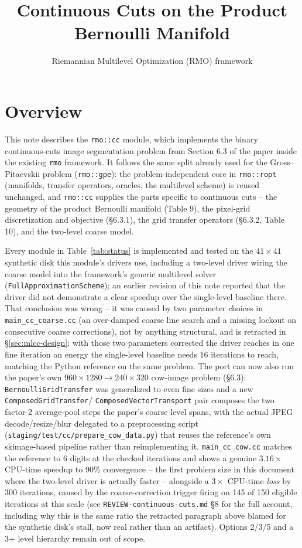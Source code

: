 \documentclass[11pt]{article}
\title{Continuous Cuts on the Product Bernoulli Manifold}
\author{Riemannian Multilevel Optimization (RMO) framework}
\date{}
\begin{document}
\maketitle

\section{Overview}

This note describes the \texttt{rmo::cc} module, which implements the binary
continuous-cuts image segmentation problem from Section 6.3 of the paper inside the
existing \texttt{rmo} framework. It follows the same split already used for the
Gross--Pitaevskii problem (\texttt{rmo::gpe}): the problem-independent core in
\texttt{rmo::ropt} (manifolds, transfer operators, oracles, the multilevel scheme) is
reused unchanged, and \texttt{rmo::cc} supplies the parts specific to continuous cuts --
the geometry of the product Bernoulli manifold (Table 9), the pixel-grid discretization
and objective (\S 6.3.1), the grid transfer operators (\S 6.3.2, Table 10), and the
two-level coarse model.

Every module in Table~\ref{tab:status} is implemented and tested on the $41\times41$
synthetic disk this module's drivers use, including a two-level driver wiring the coarse
model into the framework's generic multilevel solver (\texttt{FullApproximationScheme}); an
earlier revision of this note reported that the driver did not demonstrate a clear speedup
over the single-level baseline there. That conclusion was wrong -- it was caused by two
parameter choices in \texttt{main\_cc\_coarse.cc} (an over-damped coarse line search and a
missing lockout on consecutive coarse corrections), not by anything structural, and is
retracted in \S\ref{sec:mlcc-design}; with those two parameters corrected the driver reaches
in one fine iteration an energy the single-level baseline needs 16 iterations to reach,
matching the Python reference on the same problem. The port can now also run the paper's
own $960\times1280\to240\times320$ cow-image problem (\S6.3): \texttt{BernoulliGridTransfer}
was generalized to even fine sizes and a new \texttt{ComposedGridTransfer}/
\texttt{ComposedVectorTransport} pair composes the two factor-2 average-pool steps the
paper's coarse level spans, with the actual JPEG decode/resize/blur delegated to a
preprocessing script (\texttt{staging/test/cc/prepare\_cow\_data.py}) that reuses the reference's own
skimage-based pipeline rather than reimplementing it. \texttt{main\_cc\_cow.cc} matches the
reference to 6 digits at the checked iterations and shows a genuine $3.16\times$ CPU-time
speedup to 90\% convergence -- the first problem size in this document where the two-level
driver is actually faster -- alongside a $3\times$ CPU-time \emph{loss} by 300 iterations,
caused by the coarse-correction trigger firing on 145 of 150 eligible iterations at this
scale (see \texttt{REVIEW-continuous-cuts.md} \S8 for the full account, including why this is
the same ratio the retracted paragraph above blamed for the synthetic disk's stall, now
real rather than an artifact). Options 2/3/5 and a 3+ level hierarchy remain out of scope.
\end{document}
